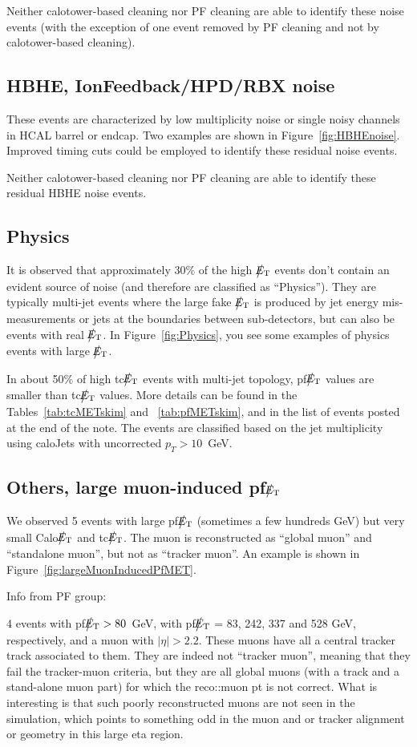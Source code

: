 Neither calotower-based cleaning nor PF cleaning are able to identify these noise events 
(with the exception of one event removed by PF cleaning and not by calotower-based cleaning).

\subsection{HBHE, IonFeedback/HPD/RBX noise}
These events are characterized by low multiplicity noise or single noisy channels in HCAL barrel or endcap.
Two examples are shown in Figure~\ref{fig:HBHEnoise}.
Improved timing cuts could be employed to identify these residual noise events.

Neither calotower-based cleaning nor PF cleaning are able to identify these residual HBHE noise events.

\subsection{Physics}
It is observed that approximately 30\% of the high $\big\slash\hspace{-1.6ex}{E_\text{T}}$ events don't contain an evident source of noise
(and therefore are classified as ``Physics''). They are typically multi-jet events where 
the large fake $\big\slash\hspace{-1.6ex}{E_\text{T}}$ is produced by jet energy mis-measurements or jets at the boundaries between sub-detectors, 
but can also be events with real $\big\slash\hspace{-1.6ex}{E_\text{T}}$. In Figure~\ref{fig:Physics}, 
you see some examples of physics events with large $\big\slash\hspace{-1.6ex}{E_\text{T}}$. 

In about 50\% of high tc$\big\slash\hspace{-1.6ex}{E_\text{T}}$ events with multi-jet topology, pf$\big\slash\hspace{-1.6ex}{E_\text{T}}$ values are 
smaller than tc$\big\slash\hspace{-1.6ex}{E_\text{T}}$ values. More details can be found in 
the Tables~\ref{tab:tcMETskim} and ~\ref{tab:pfMETskim}, and in the list of events posted at the end of the note.
The events are classified based on the jet multiplicity using caloJets with uncorrected $p_T>10$~GeV.

\subsection{Others, large muon-induced pf$\big\slash\hspace{-1.6ex}{E_\text{T}}$}
We observed 5 events with large pf$\big\slash\hspace{-1.6ex}{E_\text{T}}$ (sometimes a few hundreds GeV) 
but very small Calo$\big\slash\hspace{-1.6ex}{E_\text{T}}$ and tc$\big\slash\hspace{-1.6ex}{E_\text{T}}$. 
The muon is reconstructed as ``global muon'' and ``standalone muon'', 
but not as ``tracker muon''. An example is shown in Figure~\ref{fig:largeMuonInducedPfMET}.

Info from PF group:

4 events with pf$\big\slash\hspace{-1.6ex}{E_\text{T}}>80$~GeV, with pf$\big\slash\hspace{-1.6ex}{E_\text{T}}$ = 83, 242, 337
and 528 GeV, respectively, and a muon with $|\eta| > 2.2$. 
These muons have all a central tracker track associated to them. They are
indeed not ``tracker muon'', meaning that they fail the tracker-muon
criteria, but they are all global muons (with a track and a stand-alone
muon part) for which the reco::muon pt is not correct. 
What is interesting is that such poorly reconstructed muons are not seen
in the simulation, which points to something odd in the muon and or
tracker alignment or geometry in this large eta region.


